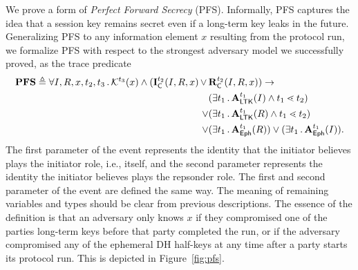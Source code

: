 We prove a form of \emph{Perfect Forward Secrecy} (PFS).
%
Informally, PFS captures the idea that a session key remains secret even if
a long-term key leaks in the future.
%
Generalizing PFS to any information element $x$ resulting from the protocol
run, we formalize PFS with respect to the strongest adversary model we
successfully proved, as the trace predicate
%
\begin{align*}
    \mathbf{PFS} \triangleq
    \forall I, R, x, t_2, t_3\operatorname{.}
    \mathcal{K}^{t_3}(x) \land (\mathbf{I}_{\textsf{C}}^{t_2}(I, R, x)\, \lor\, & \mathbf{R}_{\textsf{C}}^{t_2}(I, R, x))
    \rightarrow\\
    &(\exists t_1\operatorname{.} \mathbf{A}_{\textsf{LTK}}^{t_1}(I) \land t_1 \lessdot t_2)\\
    \lor&(\exists t_1\operatorname{.} \mathbf{A}_{\textsf{LTK}}^{t_1}(R) \land t_1 \lessdot t_2)\\
    \lor&(\exists t_1\operatorname{.} \mathbf{A}_{\textsf{Eph}}^{t_1}(R))
    \lor(\exists t_1\operatorname{.} \mathbf{A}_{\textsf{Eph}}^{t_1}(I)).
\end{align*}
%
The first parameter of the \mIComplete{} event represents the
identity that the initiator believes plays the initiator role, i.e., itself,
and the second parameter represents the identity the initiator believes plays
the repsonder role.
%
The first and second parameter of the \mRComplete{} event are defined the same
way.
%
The meaning of remaining variables and types should be clear from previous
descriptions.
%
The essence of the definition is that an adversary only knows $x$ if they
compromised one of the
parties long-term keys before that party completed the run, or if the adversary
compromised any of the ephemeral DH half-keys at any time after a party starts
its protocol run.
%
This is depicted in Figure~\ref{fig:pfs}.
%

